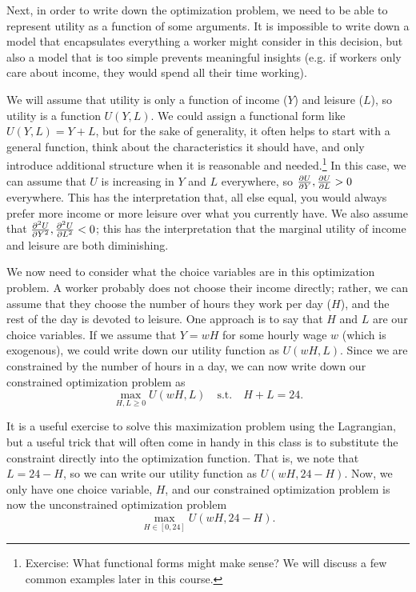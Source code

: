 Next, in order to write down the optimization problem, we need to be able to represent utility as a function of some arguments. It is impossible to write down a model that encapsulates everything a worker might consider in this decision, but also a model that is too simple prevents meaningful insights (e.g. if workers only care about income, they would spend all their time working). 

We will assume that utility is only a function of income ($Y$) and leisure ($L$), so utility is a function $U(Y, L)$. We could assign a functional form like $U(Y, L) = Y + L$, but for the sake of generality, it often helps to start with a general function, think about the characteristics it should have, and only introduce additional structure when it is reasonable and needed.\footnote{Exercise: What functional forms might make sense? We will discuss a few common examples later in this course.} In this case, we can assume that $U$ is increasing in $Y$ and $L$ everywhere, so $\frac{\partial U}{\partial Y}, \frac{\partial U}{\partial L} > 0$ everywhere. This has the interpretation that, all else equal, you would always prefer more income or more leisure over what you currently have. We also assume that $\frac{\partial ^2 U}{\partial Y^2}, \frac{\partial ^2 U}{\partial L^2} < 0$; this has the interpretation that the marginal utility of income and leisure are both diminishing.

We now need to consider what the choice variables are in this optimization problem. A worker probably does not choose their income directly; rather, we can assume that they choose the number of hours they work per day ($H$), and the rest of the day is devoted to leisure. One approach is to say that $H$ and $L$ are our choice variables. If we assume that $Y = wH$ for some hourly wage $w$ (which is exogenous), we could write down our utility function as $U(wH, L)$. Since we are constrained by the number of hours in a day, we can now write down our constrained optimization problem as 
$$\max_{H, L \geq 0} U(wH, L) \quad \text{s.t.} \quad H + L = 24.$$

It is a useful exercise to solve this maximization problem using the Lagrangian, but a useful trick that will often come in handy in this class is to substitute the constraint directly into the optimization function. That is, we note that $L = 24 - H$, so we can write our utility function as $U(wH, 24 - H)$. Now, we only have one choice variable, $H$, and our constrained optimization problem is now the unconstrained optimization problem
$$\max_{H \in [0, 24]} U(wH, 24 - H).$$

